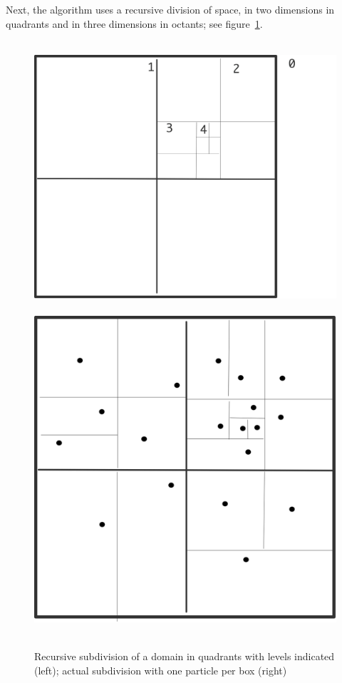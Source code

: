 Next, the algorithm uses a recursive division of space, in two
dimensions in quadrants and in three dimensions in octants; see
figure~\ref{fig:bh-quadrants}.
\begin{figure}[ht]
  \hbox{%
  \includegraphics[scale=.1]{graphics-public/bh-quadrants}
  \includegraphics[scale=.1]{graphics-public/bh-quadrants-filled}%
  }
  \caption{Recursive subdivision of a domain in quadrants with levels
    indicated (left); actual subdivision with one particle per box (right)}
  \label{fig:bh-quadrants}
\end{figure}

